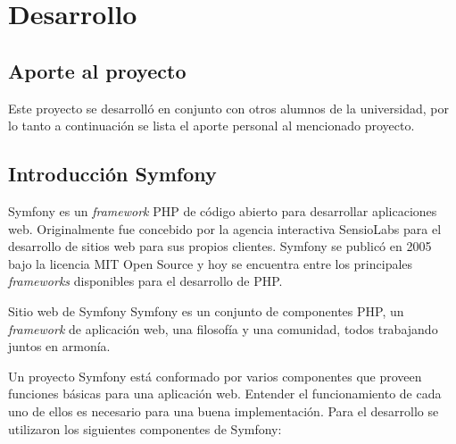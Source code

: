 
\section{Desarrollo}%
\label{sec:desarrollo}

\subsection{Aporte al proyecto}%
\label{ssub:aporte_al_proyecto}
Este proyecto se desarrolló en conjunto con otros alumnos de la universidad, por lo tanto a continuación se lista el aporte personal al mencionado proyecto.



\subsection{Introducción Symfony}%
\label{ssub:introduccion_symfony}
Symfony es un \textit{framework} PHP de código abierto para desarrollar aplicaciones web. Originalmente fue concebido por la
agencia interactiva SensioLabs para el desarrollo de sitios web para sus propios clientes. Symfony se publicó en 2005 bajo
la licencia MIT Open Source y hoy se encuentra entre los principales \textit{frameworks} disponibles para el desarrollo de PHP. \textcite{symfony-def}
\begin{aquote}{Sitio web de Symfony}
Symfony es un conjunto de componentes PHP, un \textit{framework} de aplicación web, una filosofía y una comunidad, todos trabajando juntos en armonía.
\end{aquote}
Un proyecto Symfony está conformado por varios componentes que proveen funciones básicas para una aplicación web. Entender
el funcionamiento de cada uno de ellos es necesario para una buena implementación. Para el desarrollo se utilizaron los siguientes componentes de Symfony:


\begin{itemize}
    
\end{itemize}
\newpage






\newpage



